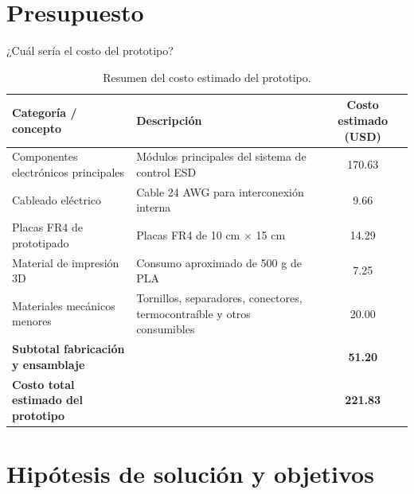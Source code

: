 \documentclass[aspectratio=169]{beamer}
\newcommand{\rightfootertext}{}
\newcommand{\setrightfooter}[1]{\gdef\rightfootertext{#1}}
\begin{document}
\section{Presupuesto}
\begin{frame}{¿Cuál sería el costo del prototipo?}

\begin{table}
\centering
\caption{Resumen del costo estimado del prototipo.}
\label{tab:costo_prototipo_beamer}

\scriptsize
\renewcommand{\arraystretch}{1.25}

\begin{tabular}{p{5.2cm} p{5.2cm} c}
\toprule
\textbf{Categoría / concepto} &
\textbf{Descripción} &
\textbf{Costo estimado (USD)} \\
\midrule

Componentes electrónicos principales &
Módulos principales del sistema de control ESD &
170.63 \\

Cableado eléctrico &
Cable 24 AWG para interconexión interna \cite{AWG24Wire} &
9.66 \\

Placas FR4 de prototipado &
Placas FR4 de 10 cm $\times$ 15 cm \cite{FR4ProtoBoard} &
14.29 \\

Material de impresión 3D &
Consumo aproximado de 500 g de PLA \cite{PLA500gCost} &
7.25 \\

Materiales mecánicos menores &
Tornillos, separadores, conectores, termocontraíble y otros consumibles &
20.00 \\

\midrule
\textbf{Subtotal fabricación y ensamblaje} &
&
\textbf{51.20} \\

\midrule
\textbf{Costo total estimado del prototipo} &
&
\textbf{221.83} \\

\bottomrule
\end{tabular}

\end{table}

\end{frame}


\setrightfooter{ ¿Qué se espera demostrar?}
\section{Hipótesis de solución y objetivos}
\end{document}
